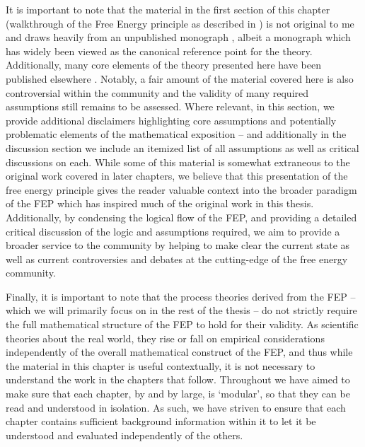 It is important to note that the material in the first section of this chapter (walkthrough of the Free Energy principle as described in \citet{friston2019particularphysics}) is not original to me and draws heavily from an unpublished monograph \citep{friston2019particularphysics}, albeit a monograph which has widely been viewed as the canonical reference point for the theory. Additionally, many core elements of the theory presented here have been published elsewhere \citep{friston2013life, friston2020some,parr2020Markov,friston2020sentience}. Notably, a fair amount of the material covered here is also controversial within the community and the validity of many required assumptions still remains to be assessed. Where relevant, in this section, we provide additional disclaimers highlighting core assumptions and potentially problematic elements of the mathematical exposition -- and additionally in the discussion section we include an itemized list of all assumptions as well as critical discussions on each. While some of this material is somewhat extraneous to the original work covered in later chapters, we believe that this presentation of the free energy principle gives the reader valuable context into the broader paradigm of the FEP which has inspired much of the original work in this thesis. Additionally, by condensing the logical flow of the FEP, and providing a detailed critical discussion of the logic and assumptions required, we aim to provide a broader service to the community by helping to make clear the current state as well as current controversies and debates at the cutting-edge of the free energy community.

Finally, it is important to note that the process theories derived from the FEP -- which we will primarily focus on in the rest of the thesis -- do not strictly require the full mathematical structure of the FEP to hold for their validity. As scientific theories about the real world, they rise or fall on empirical considerations independently of the overall mathematical construct of the FEP, and thus while the material in this chapter is useful contextually, it is not necessary to understand the work in the chapters that follow. Throughout we have aimed to make sure that each chapter, by and by large, is `modular', so that they can be read and understood in isolation. As such, we have striven to ensure that each chapter contains sufficient background information within it to let it be understood and evaluated independently of the others.


